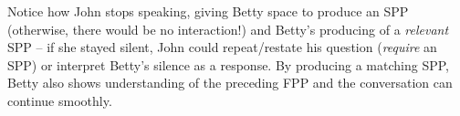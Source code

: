 \documentclass[11pt]{article}
\begin{document}
{    %
    Notice how John stops speaking, giving Betty space to produce an SPP (otherwise, there would be no interaction!)
    and Betty's producing of a \textit{relevant} SPP -- if she stayed silent, John could repeat/restate his question (\textit{require} an SPP) or interpret Betty's silence as a response.
    By producing a matching SPP, Betty also shows understanding of the preceding FPP and the conversation can continue smoothly.

}
\end{document}
